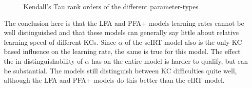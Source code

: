 \documentclass{scrartcl}
\begin{document}
\begin{figure}[!htbp]
\centering
{}
\hspace{0mm}
\caption{Kendall's Tau rank orders of the different parameter-types}
\label{fig:ranks}
\end{figure}

The conclusion here is that the LFA and PFA+ models learning rates cannot be well distinguished and that these models can generally say little about relative learning speed of different KCs. Since $\alpha$ of the seIRT model also is the only KC based influence on the learning rate, the same is true for this model. The effect the in-distinguishability of $\alpha$ has on the entire model is harder to qualify, but can be substantial. The models still distinguish between KC difficulties quite well, although the LFA and PFA+ models do this better than the eIRT model.
\end{document}

